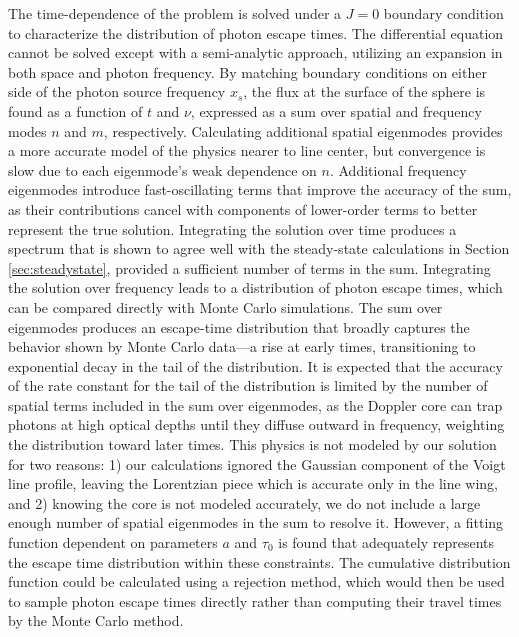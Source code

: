 \documentclass{aastex63}
\begin{document}
The time-dependence of the problem is solved under a $J=0$ boundary condition to characterize the distribution of photon escape times. The differential equation cannot be solved except with a semi-analytic approach, utilizing an expansion in both space and photon frequency. By matching boundary conditions on either side of the photon source frequency $x_s$, the flux at the surface of the sphere is found as a function of $t$ and $\nu$, expressed as a sum over spatial and frequency modes $n$ and $m$, respectively. Calculating additional spatial eigenmodes provides a more accurate model of the physics nearer to line center, but convergence is slow due to each eigenmode's weak dependence on $n$. Additional frequency eigenmodes introduce fast-oscillating terms that improve the accuracy of the sum, as their contributions cancel with components of lower-order terms to better represent the true solution. Integrating the solution over time produces a spectrum that is shown to agree well with the steady-state calculations in Section \ref{sec:steadystate}, provided a sufficient number of terms in the sum. Integrating the solution over frequency leads to a distribution of photon escape times, which can be compared directly with Monte Carlo simulations. The sum over eigenmodes produces an escape-time distribution that broadly captures the behavior shown by Monte Carlo data---a rise at early times, transitioning to exponential decay in the tail of the distribution. It is expected that the accuracy of the rate constant for the tail of the distribution is limited by the number of spatial terms included in the sum over eigenmodes, as the Doppler core can trap photons at high optical depths until they diffuse outward in frequency, weighting the distribution toward later times. This physics is not modeled by our solution for two reasons: 1) our calculations ignored the Gaussian component of the Voigt line profile, leaving the Lorentzian piece which is accurate only in the line wing, and 2) knowing the core is not modeled accurately, we do not include a large enough number of spatial eigenmodes in the sum to resolve it. However, a fitting function dependent on parameters $a$ and $\tau_0$ is found that adequately represents the escape time distribution within these constraints. The cumulative distribution function could be calculated using a rejection method, which would then be used to sample photon escape times directly rather than computing their travel times by the Monte Carlo method.
\end{document}
